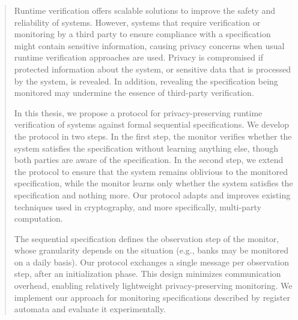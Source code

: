 \documentclass[final]{istaustriathesis}
\begin{document}
\frontmatter %
\pagestyle{plain} %

\addtitlepage
\addcommitteepage
\addstatementpage

\setcounter{page}{1} %
\begin{abstract}
Runtime verification offers scalable solutions to improve the safety and reliability of systems. However, systems that require verification or monitoring by a third party to ensure compliance with a specification might contain sensitive information, causing privacy concerns when usual runtime verification approaches are used. Privacy is compromised if protected information about the system, or sensitive data that is processed by the system, is revealed. In addition, revealing the specification being monitored may undermine the essence of third-party verification.

In this thesis, we propose a protocol for privacy-preserving runtime verification of systems against formal sequential specifications. We develop the protocol in two steps. In the first step, the monitor verifies whether the system satisfies the specification without learning anything else, though both parties are aware of the specification. In the second step, we extend the protocol to ensure that the system remains oblivious to the monitored specification, while the monitor learns only whether the system satisfies the specification and nothing more. Our protocol adapts and improves existing techniques used in cryptography, and more specifically, multi-party computation.

The sequential specification defines the observation step of the monitor, whose granularity depends on the situation (e.g., banks may be monitored on a daily basis). Our protocol exchanges a single message per observation step, after an initialization phase. This design minimizes communication overhead, enabling relatively lightweight privacy-preserving monitoring. We implement our approach for monitoring specifications described by register automata and evaluate it experimentally.
\end{abstract}
\end{document}
